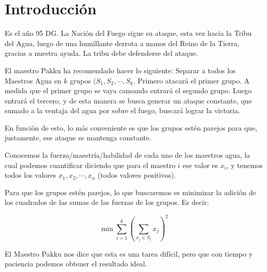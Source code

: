 \section{Introducción}

Es el año 95 DG. La Nación del Fuego sigue su ataque, esta vez hacia la Tribu del Agua,
luego de una humillante derrota a manos del Reino de la Tierra, gracias a nuestra ayuda.
La tribu debe defenderse del ataque.

El maestro Pakku ha recomendado hacer lo siguiente: Separar a todos los Maestros Agua en 
$k$ grupos $(S_{1},S_{2},\cdots ,S_{k}$. Primero atacará el primer grupo. A medida que el primer
grupo se vaya cansando entrará el segundo grupo. Luego entrará el tercero, y de esta manera
se busca generar un ataque constante, que sumado a la ventaja del agua por sobre el fuego,
buscará lograr la victoria.

En función de esto, lo más conveniente es que los grupos estén parejos para que, justamente,
ese ataque se mantenga constante.

Conocemos la fuerza/maestría/habilidad de cada uno de los maestros agua, la cual podemos
cuantificar diciendo que para el maestro $i$ ese valor es $x_{i}$, y tenemos todos los
valores $x_{1},x_{2},\cdots ,x_{n}$ (todos valores positivos).

Para que los grupos estén parejos, lo que buscaremos es minimizar la adición de los cuadrados
de las sumas de las fuerzas de los grupos. Es decir:

\[
\min\sum_{i=1}^{k}\left( \sum_{x_{j}\in S_{i}}^{}x_{j} \right)^{2}
\]
 
El Maestro Pakku nos dice que esta es una tarea difícil, pero que con tiempo y paciencia podemos
obtener el resultado ideal.